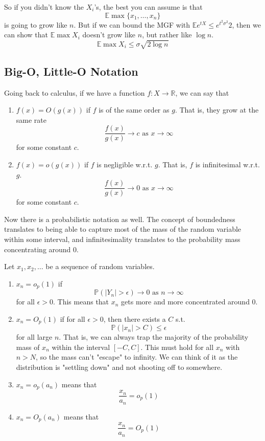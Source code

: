 \documentclass{article}
\begin{document}
    So if you didn't know the $X_i$'s, the best you can assume is that 
    \[\mathbb{E} \max\{x_1, \ldots, x_n\}\]
    is going to grow like $n$. But if we can bound the MGF with $\mathbb{E} e^{t X} \leq e^{t^2 \sigma^2}{2}$, then we can show that $\mathbb{E} \max X_i$ doesn't grow like $n$, but rather like $\log{n}$. 
    \[\mathbb{E} \max{X_i} \leq \sigma \sqrt{2 \log{n}}\]

    \subsection{Big-O, Little-O Notation}

    Going back to calculus, if we have a function $f: X \longrightarrow \mathbb{R}$, we can say that 
    \begin{enumerate}
        \item $f(x) = O(g(x))$ if $f$ is of the same order as $g$. That is, they grow at the same rate 
        \[\frac{f(x)}{g(x)} \rightarrow c \text{ as } x \rightarrow \infty\]
        for some constant $c$. 
        \item $f(x) = o(g(x))$ if $f$ is negligible w.r.t. $g$. That is, $f$ is infinitesimal w.r.t. $g$. 
        \[\frac{f(x)}{g(x)} \rightarrow 0 \text{ as } x \rightarrow \infty\]
        for some constant $c$. 
    \end{enumerate}
    Now there is a probabilistic notation as well. The concept of boundedness translates to being able to capture most of the mass of the random variable within some interval, and infinitesimality translates to the probability mass concentrating around $0$. 

    \begin{definition}[$O_p, o_p$ Notation]
    Let $x_1, x_2, \ldots $ be a sequence of random variables. 
    \begin{enumerate}
        \item $x_n = o_p (1)$ if 
        \[\mathbb{P}(|Y_n| > \epsilon) \rightarrow 0 \text{ as } n \rightarrow \infty\]
        for all $\epsilon > 0$. This means that $x_n$ gets more and more concentrated around $0$. 

        \item $x_n = O_p(1)$ if for all $\epsilon > 0$, then there exists a $C$ s.t. 
        \[\mathbb{P}(|x_n| > C) \leq \epsilon\]
        for all large $n$. That is, we can always trap the majority of the probability mass of $x_n$ within the interval $[-C, C]$. This must hold for all $x_n$ with $n > N$, so the mass can't "escape" to infinity. We can think of it as the distribution is "settling down" and not shooting off to somewhere. 

        \item $x_n = o_p (a_n)$ means that 
        \[\frac{x_n}{a_n} = o_p (1)\]

        \item $x_n = O_p (a_n)$ means that 
        \[\frac{x_n}{a_n} = O_p(1)\]
    \end{enumerate}
    \end{definition}
\end{document}
